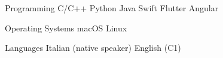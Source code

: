 

\begin{cvskills}

  \cvskill
    {Programming} %
    {C/C++ {\enskip\cdotp\enskip} Python {\enskip\cdotp\enskip} Java {\enskip\cdotp\enskip} Swift {\enskip\cdotp\enskip} Flutter {\enskip\cdotp\enskip} Angular} %
    
  \cvskill
    {Operating Systems} %
    {macOS {\enskip\cdotp\enskip} Linux} %

  \cvskill
    {Languages} %
    {Italian (native speaker) {\enskip\cdotp\enskip} English (C1)} %

\end{cvskills}
